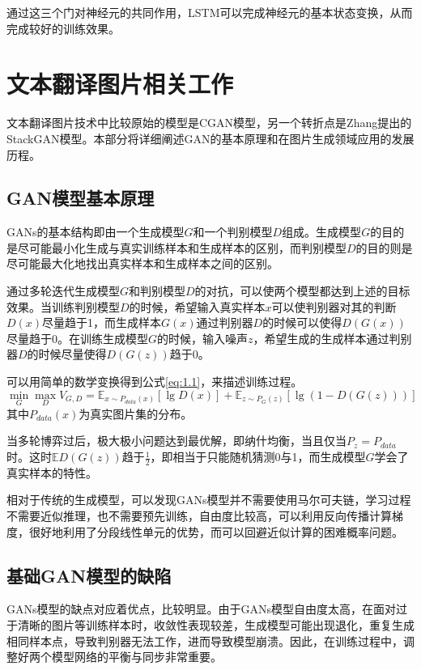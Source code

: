 通过这三个门对神经元的共同作用，LSTM可以完成神经元的基本状态变换，从而完成较好的训练效果。

\section{文本翻译图片相关工作}
文本翻译图片技术中比较原始的模型是CGAN模型，另一个转折点是Zhang提出的StackGAN模型。本部分将详细阐述GAN的基本原理和在图片生成领域应用的发展历程。

\subsection{GAN模型基本原理}
GANs的基本结构即由一个生成模型$G$和一个判别模型$D$组成。生成模型$G$的目的是尽可能最小化生成与真实训练样本和生成样本的区别，而判别模型$D$的目的则是尽可能最大化地找出真实样本和生成样本之间的区别。

通过多轮迭代生成模型$G$和判别模型$D$的对抗，可以使两个模型都达到上述的目标效果。当训练判别模型$D$的时候，希望输入真实样本$x$可以使判别器对其的判断$D(x)$尽量趋于1，而生成样本$G(x)$通过判别器$D$的时候可以使得$D(G(x))$尽量趋于0。在训练生成模型$G$的时候，输入噪声$z$，希望生成的生成样本通过判别器$D$的时候尽量使得$D(G(z))$趋于0。

可以用简单的数学变换得到公式\eqref{eq:1.1}，来描述训练过程。
\begin{equation}
    \label{eq:1.1}
    \min_{G}\max_{D} V_{G,D} = \mathbb{E}_{x \sim P_{data}(x)}[\lg D(x)] + \mathbb{E}_{z \sim P_{G}(z)}[\lg (1-D(G(z)))]
\end{equation}
其中$P_{data}(x)$为真实图片集的分布。

当多轮博弈过后，极大极小问题达到最优解，即纳什均衡，当且仅当$P_z = P_{data}$时。这时$\mathbb{E} D(G(z))$趋于$\frac{1}{2}$，即相当于只能随机猜测0与1，而生成模型$G$学会了真实样本的特性。

相对于传统的生成模型，可以发现GANs模型并不需要使用马尔可夫链，学习过程不需要近似推理，也不需要预先训练，自由度比较高，可以利用反向传播计算梯度，很好地利用了分段线性单元的优势，而可以回避近似计算的困难概率问题。
\subsection{基础GAN模型的缺陷}
GANs模型的缺点对应着优点，比较明显。由于GANs模型自由度太高，在面对过于清晰的图片等训练样本时，收敛性表现较差，生成模型可能出现退化，重复生成相同样本点，导致判别器无法工作，进而导致模型崩溃。因此，在训练过程中，调整好两个模型网络的平衡与同步非常重要。

